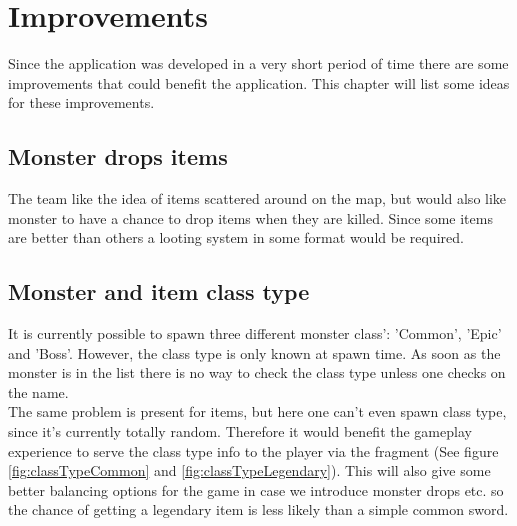 \pagestyle{Uni}

\chapter{Improvements}

Since the application was developed in a very short period of time there are some improvements that could benefit the application. This chapter will list some ideas for these improvements.

\section{Monster drops items}
The team like the idea of items scattered around on the map, but would also like monster to have a chance to drop items when they are killed. Since some items are better than others a looting system in some format would be required.

\section{Monster and item class type}
It is currently possible to spawn three different monster class': 'Common', 'Epic' and 'Boss'. However, the class type is only known at spawn time. As soon as the monster is in the list there is no way to check the class type unless one checks on the name. \\
The same problem is present for items, but here one can't even spawn class type, since it's currently totally random. Therefore it would benefit the gameplay experience to serve the class type info to the player via the fragment (See figure \ref{fig:classTypeCommon} and \ref{fig:classTypeLegendary}). This will also give some better balancing options for the game in case we introduce monster drops etc. so the chance of getting a legendary item is less likely than a simple common sword.

